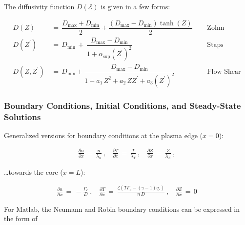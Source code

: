 \documentclass[a4paper,8pt]{article}
\begin{document}
\normalsize

The diffusivity function \(D(\mathcal{E})\) is given in a few forms:
\small

\begin{align}
    D(Z) \,&=\, \dfrac{D_\text{max} + D_\text{min}}{2} + \dfrac{(D_\text{max} - D_\text{min})\tanh(Z)}{2} ~~~~~~ &\text{Zohm} \\
    D(Z^\prime) \,&=\, D_\text{min} \,+\, \dfrac{D_\text{max} - D_\text{min}}{1 + \alpha_\text{sup}(Z^\prime)^2} ~~~~~~ &\text{Staps} \\
    D(Z, Z^\prime) \,&=\, D_\text{min} + \dfrac{D_\text{max} - D_\text{min}}{1 + a_1\,Z^2 + a_2\,Z Z^\prime + a_3\left(Z^\prime\right)^2} ~~~~~~ &\text{Flow-Shear}
\end{align}

\normalsize

\subsubsection{Boundary Conditions, Initial Conditions, and Steady-State
Solutions}\label{boundary-conditions-initial-conditions-and-steady-state-solutions}

Generalized versions for boundary conditions at the plasma edge
(\(x=0\)): \small

\begin{align}
    \frac{\partial n}{\partial x} \,=\, \frac{n}{\lambda_n}~, ~~~~\frac{\partial T}{\partial x} \,=\, \frac{T}{\lambda_T}~, ~~~~\frac{\partial Z}{\partial x} \,=\, \frac{Z}{\lambda_Z}~,
\end{align}

\normalsize

\ldots{}towards the core (\(x=L\)): \small

\begin{align}
    \frac{\partial n}{\partial x} \,=\, -\frac{\Gamma_c}{D}~, ~~~~ \frac{\partial T}{\partial x} \,=\ \frac{\zeta\left(T \Gamma_c - (\gamma - 1) q_c\right)}{n\,D}~, ~~~~\frac{\partial Z}{\partial x} \,=\, 0
\end{align}

\normalsize

For Matlab, the Neumann and Robin boundary conditions can be expressed
in the form of \small
\end{document}
